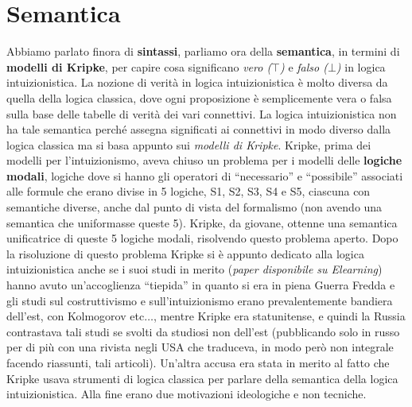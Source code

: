 \documentclass[a4paper,12pt, oneside]{book}
\begin{document}
\section{Semantica}
Abbiamo parlato finora di \textbf{sintassi}, parliamo ora della
\textbf{semantica}, in termini di \textbf{modelli di Kripke}, per capire cosa
significano \textit{vero ($\top$)} e \textit{falso ($\bot$)} in logica
intuizionistica. La nozione di verità in logica intuizionistica è molto diversa
da quella della logica classica, dove ogni proposizione è semplicemente vera o
falsa sulla base delle tabelle di verità dei vari connettivi. La logica
intuizionistica non ha tale semantica perché assegna significati ai connettivi
in modo diverso dalla logica classica ma si basa appunto sui \textit{modelli di
  Kripke}. Kripke, prima dei modelli per l'intuizionismo, aveva chiuso un
problema per i modelli delle \textbf{logiche modali}, logiche dove si hanno gli
operatori di ``necessario'' e ``possibile'' associati alle formule che erano
divise in 5 logiche, S1, S2, S3, S4 e S5, ciascuna con semantiche diverse, anche
dal punto di vista del formalismo (non avendo una semantica che uniformasse
queste 5). Kripke, da giovane, ottenne una semantica unificatrice di queste 5
logiche modali, risolvendo questo problema aperto. Dopo la risoluzione di questo
problema Kripke si è appunto dedicato alla logica intuizionistica anche se i
suoi studi in merito (\textit{paper disponibile su Elearning}) hanno avuto
un'accoglienza ``tiepida'' in quanto si era in piena Guerra Fredda e gli studi
sul costruttivismo e sull'intuizionismo erano prevalentemente bandiera dell'est,
con Kolmogorov etc$\ldots$, mentre Kripke era statunitense, e quindi la Russia
contrastava tali studi se svolti da studiosi non dell'est (pubblicando solo in
russo per di più con una rivista negli USA che traduceva, in modo però non
integrale facendo riassunti, tali articoli). Un'altra accusa era
stata in merito al fatto che Kripke usava strumenti di logica classica per
parlare della semantica della logica intuizionistica. Alla fine erano due
motivazioni ideologiche e non tecniche.
\end{document}
